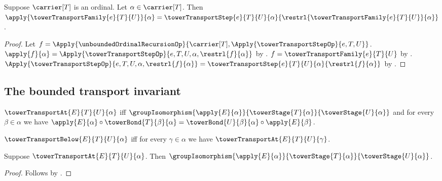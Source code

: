\begin{proposition}\label{tower_transport_family_equation}
    Suppose $\carrier[T]$ is an ordinal.
    Let $\alpha\in\carrier[T]$.
    Then $\apply{\towerTransportFamily{e}{T}{U}}{\alpha}=
        \towerTransportStep{e}{T}{U}{\alpha}{
            \restrl{\towerTransportFamily{e}{T}{U}}{\alpha}}$.
\end{proposition}
\begin{proof}
    Let $f=\Apply{\unboundedOrdinalRecursionOp}
        {\carrier[T],\Apply{\towerTransportStepOp}{e,T,U}}$.
    $\apply{f}{\alpha}=
        \Apply{\towerTransportStepOp}{e,T,U,\alpha,\restrl{f}{\alpha}}$ by
        .
    $f=\towerTransportFamily{e}{T}{U}$ by
        .
    $\Apply{\towerTransportStepOp}{e,T,U,\alpha,\restrl{f}{\alpha}}=
        \towerTransportStep{e}{T}{U}{\alpha}{\restrl{f}{\alpha}}$ by
        .
\end{proof}

\subsection{The bounded transport invariant}

\begin{definition}\label{tower_transport_at}
    $\towerTransportAt{E}{T}{U}{\alpha}$ iff
        $\groupIsomorphism{\apply{E}{\alpha}}
            {\towerStage{T}{\alpha}}{\towerStage{U}{\alpha}}$ and
        for every $\beta\in\alpha$ we have
            $\apply{E}{\alpha}\circ\towerBond{T}{\beta}{\alpha}=
                \towerBond{U}{\beta}{\alpha}\circ\apply{E}{\beta}$.
\end{definition}

\begin{definition}\label{tower_transport_below}
    $\towerTransportBelow{E}{T}{U}{\alpha}$ iff
        for every $\gamma\in\alpha$ we have
            $\towerTransportAt{E}{T}{U}{\gamma}$.
\end{definition}

\begin{proposition}\label{tower_transport_at_component}
    Suppose $\towerTransportAt{E}{T}{U}{\alpha}$.
    Then $\groupIsomorphism{\apply{E}{\alpha}}
        {\towerStage{T}{\alpha}}{\towerStage{U}{\alpha}}$.
\end{proposition}
\begin{proof}
    Follows by .
\end{proof}

